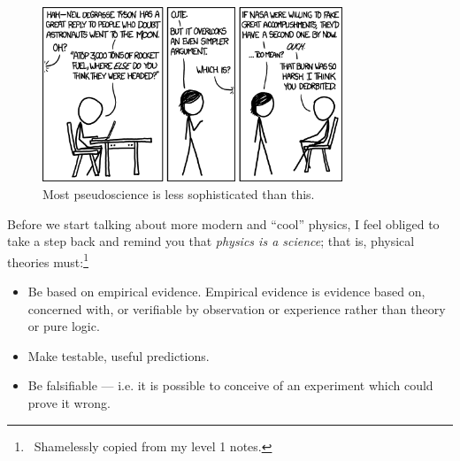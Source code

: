 \documentclass[a4paper]{amsbook}
\theoremstyle{definition}
\numberwithin{exercise}{chapter}
\numberwithin{exercise}{chapter}
\begin{document}
\begin{figure}
  \centering
  \includegraphics[width=0.8\textwidth]{moon_landing}
  \caption{Most pseudoscience is less sophisticated than this.}\label{fig:moon_landing}
\end{figure}


Before we start talking about more modern and ``cool'' physics, I feel obliged to take a step
back and remind you that \emph{physics is a science}; that is, physical theories must:\footnote{~Shamelessly copied from my level 1 notes.}
\begin{itemize}
  \item Be based on empirical evidence. Empirical evidence is evidence based on, concerned with, or verifiable by observation or
        experience rather than theory or pure logic.
  \item Make testable, useful predictions.
  \item Be falsifiable --- i.e. it is possible to conceive of an experiment which could prove it wrong.
\end{itemize}
\end{document}
